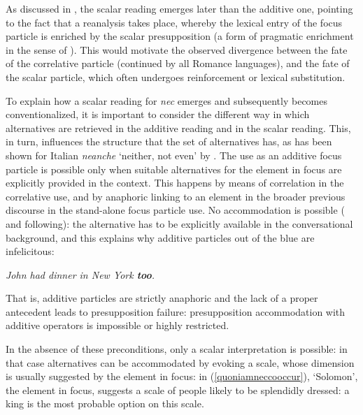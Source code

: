 \documentclass[output=paper]{langsci/langscibook}
\begin{document}
As discussed in , the scalar reading emerges later than the additive one, pointing to the fact that a reanalysis takes place, whereby the lexical entry of the focus particle is enriched by the scalar presupposition (a form of pragmatic enrichment in the sense of \citealt{TraugottDasher02}). This would motivate the observed divergence between the fate of the correlative particle (continued by all Romance languages), and the fate of the scalar particle, which often undergoes reinforcement or lexical substitution.

To explain how a scalar reading for {\emph{nec}} emerges and subsequently becomes conventionalized, it is important to consider the different way in which alternatives are retrieved in the additive reading and in the scalar reading. This, in turn, influences the structure that the set of alternatives has, as has been shown for Italian {\emph{neanche}} `neither, not even' by \citet{Tovena06}. The use as an additive focus particle is possible only when suitable alternatives for the element in focus are explicitly provided in the context. This happens by means of correlation in the correlative use, and by anaphoric linking to an element in the broader previous discourse in the stand-alone focus particle use. No accommodation is possible (\citealt[]{Zeevat92} and following): the alternative has to be explicitly available in the conversational background, and this explains why additive particles out of the blue are infelicitous:

{\begin{exe}
\ex {} \itshape  John had dinner in New York {\textbf{too}.}
\end{exe}}

\noindent That is, additive particles are strictly anaphoric and the lack of a proper antecedent leads to presupposition failure: presupposition accommodation with additive operators is impossible or highly restricted.

In the absence of these preconditions, only a scalar interpretation is possible: in that case alternatives can be accommodated by evoking a scale, whose dimension is usually suggested by the element in focus: in (\ref{quoniamneccooccur}), `Solomon', the element in focus, suggests a scale of people likely to be splendidly dressed: a king is the most probable option on this scale.
\end{document}
